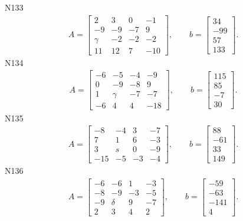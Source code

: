 \documentclass[11pt]{report}
\begin{document}
N133
\begin{align*}
 A = \left[\begin{matrix}2 & 3 & 0 & -1\\-9 & -9 & -7 & 9\\\gamma & -2 & -2 & -2\\11 & 12 & 7 & -10\end{matrix}\right],
\qquad b = \left[\begin{matrix}34\\-99\\57\\133\end{matrix}\right]. 
 \end{align*}
N134
\begin{align*}
 A = \left[\begin{matrix}-6 & -5 & -4 & -9\\0 & -9 & -8 & 9\\1 & \gamma & -7 & -7\\-6 & 4 & 4 & -18\end{matrix}\right],
\qquad b = \left[\begin{matrix}115\\85\\-7\\30\end{matrix}\right]. 
 \end{align*}
N135
\begin{align*}
 A = \left[\begin{matrix}-8 & -4 & 3 & -7\\7 & 1 & 6 & -3\\3 & s & 0 & -9\\-15 & -5 & -3 & -4\end{matrix}\right],
\qquad b = \left[\begin{matrix}88\\-61\\33\\149\end{matrix}\right]. 
 \end{align*}
N136
\begin{align*}
 A = \left[\begin{matrix}-6 & -6 & 1 & -3\\-8 & -9 & -3 & -5\\-9 & \delta & 9 & -7\\2 & 3 & 4 & 2\end{matrix}\right],
\qquad b = \left[\begin{matrix}-59\\-63\\-141\\4\end{matrix}\right]. 
 \end{align*}
\end{document}
